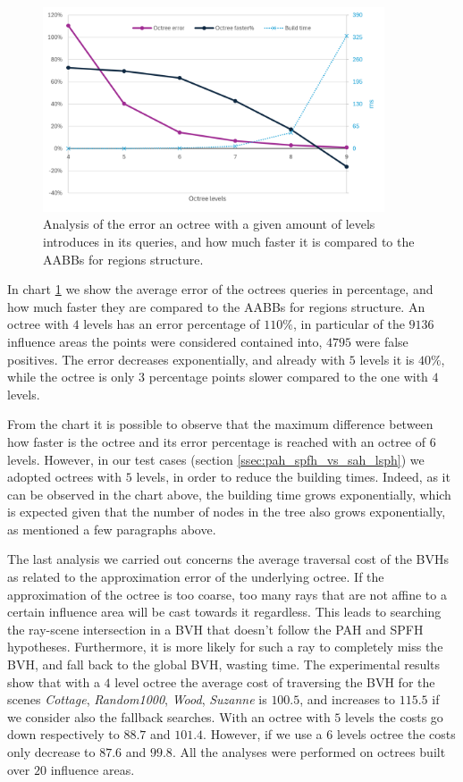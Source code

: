 \documentclass{PoliMi_MasterThesis}
\begin{document}
\begin{figure}[H] 
	\centering
	\includegraphics[width=0.9\textwidth]{Images/octree_error_faster_chart.png}
	\caption{Analysis of the error an octree with a given amount of levels introduces in its queries, and how much faster it is compared to the AABBs for regions structure.}
	\label{fig:octree_error_faster_chart}
\end{figure}

In chart \ref{fig:octree_error_faster_chart} we show the average error of the octrees queries in percentage, and how much faster they are compared to the AABBs for regions structure. An octree with $4$ levels has an error percentage of $110\%$, in particular of the $9136$ influence areas the points were considered contained into, $4795$ were false positives. The error decreases exponentially, and already with $5$ levels it is $40\%$, while the octree is only $3$ percentage points slower compared to the one with $4$ levels.

From the chart it is possible to observe that the maximum difference between how faster is the octree and its error percentage is reached with an octree of $6$ levels. However, in our test cases (section \ref{ssec:pah_spfh_vs_sah_lsph}) we adopted octrees with $5$ levels, in order to reduce the building times. Indeed, as it can be observed in the chart above, the building time grows exponentially, which is expected given that the number of nodes in the tree also grows exponentially, as mentioned a few paragraphs above.

The last analysis we carried out concerns the average traversal cost of the BVHs as related to the approximation error of the underlying octree. If the approximation of the octree is too coarse, too many rays that are not affine to a certain influence area will be cast towards it regardless. This leads to searching the ray-scene intersection in a BVH that doesn't follow the PAH and SPFH hypotheses. Furthermore, it is more likely for such a ray to completely miss the BVH, and fall back to the global BVH, wasting time. The experimental results show that with a $4$ level octree the average cost of traversing the BVH for the scenes \textit{Cottage}, \textit{Random1000}, \textit{Wood}, \textit{Suzanne} is $100.5$, and increases to $115.5$ if we consider also the fallback searches. With an octree with $5$ levels the costs go down respectively to $88.7$ and $101.4$. However, if we use a $6$ levels octree the costs only decrease to $87.6$ and $99.8$. All the analyses were performed on octrees built over $20$ influence areas.
\end{document}
